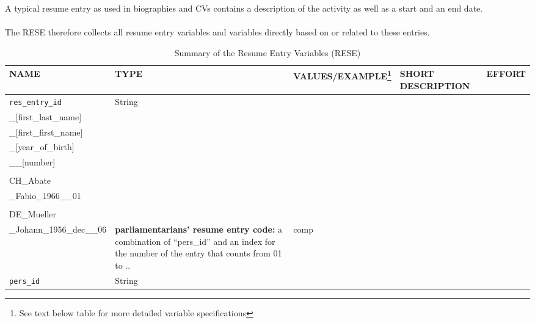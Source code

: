 \documentclass{article}
\begin{document}
    A typical resume entry as used in biographies and CVs contains a description of the activity as well as a start and an end date.
    \paragraph{} The RESE therefore collects all resume entry variables and variables directly based on or related to these entries. 


    \begin{longtable}[H!]
        {|m{}|
          m{}|
          m{}| 
          m{}|
          m{}|} 
\caption{Summary of the Resume Entry Variables (\gls{RESE})}
\label{TableWithSummaryOfRESE}
\\\hline
 NAME & TYPE & VALUES/EXAMPLE\footnote{See text below table for more detailed variable specifications} & SHORT DESCRIPTION & EFFORT \\ \hline


         \texttt{res\_entry\_id} &
        String & 
         \makecell*
        {
           [country\_abb]\\
           \_[first\_last\_name]\\
           \_[first\_first\_name]\\
           \_[year\_of\_birth]\\
           \_\_[number]\\
           \\
                CH\_Abate\\ 
                \_Fabio\_1966\_\_01\\
                \\
               DE\_Mueller\\     
               \_Johann\_1956\_dec\_\_06
        } &
      \textbf{parliamentarians' resume entry code:} a combination of ``pers\_id'' and an index for the number of the entry that counts from 01 to .. &
    \gls{comp} \\ \hline

         \texttt{pers\_id} &
        String & 
    

\end{longtable}
\end{document}
